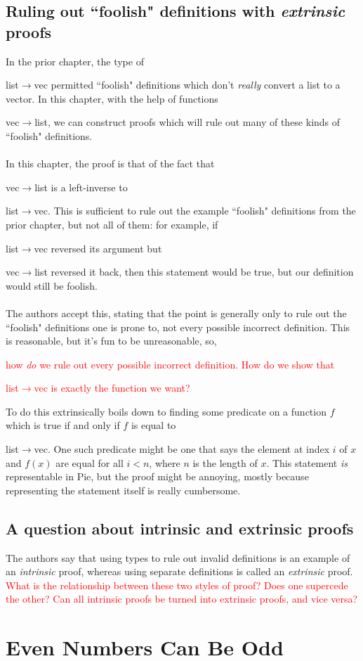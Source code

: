 \documentclass{article}
\newcommand*{\SavedLstInline}{}
\DeclareRobustCommand*{\lstinline}{%
  \ifmmode
    \let\SavedBGroup\bgroup
    \def\bgroup{%
      \let\bgroup\SavedBGroup
      \hbox\bgroup
    }%
  \fi
  \SavedLstInline
}
\begin{document}
\subsection{Ruling out ``foolish" definitions with \textit{extrinsic} proofs}
In the prior chapter, the type of \lstinline{list\(\to\)vec} permitted ``foolish" definitions which don't \textit{really} convert a list to a vector. In this chapter, with the help of functions \lstinline{vec\(\to\)list}, we can construct proofs which will rule out many of these kinds of ``foolish" definitions.
\\ \\
In this chapter, the proof is that of the fact that \lstinline{vec\(\to\)list} is a left-inverse to \lstinline{list\(\to\)vec}. This is sufficient to rule out the example ``foolish" definitions from the prior chapter, but not all of them: for example, if \lstinline{list\(\to\)vec} reversed its argument but \lstinline{vec\(\to\)list} reversed it back, then this statement would be true, but our definition would still be foolish.
\\ \\
The authors accept this, stating that the point is generally only to rule out the ``foolish" definitions one is prone to, not every possible incorrect definition. This is reasonable, but it's fun to be unreasonable, so, \textcolor{red}{how \textit{do} we rule out every possible incorrect definition. How do we show that \lstinline{list\(\to\)vec} is exactly the function we want?} To do this extrinsically boils down to finding some predicate on a function \(f\) which is true if and only if \(f\) is equal to \lstinline{list\(\to\)vec}. One such predicate might be one that says the element at index \(i\) of \(x\) and \(f(x)\) are equal for all \(i < n\), where \(n\) is the length of \(x\). This statement \textit{is} representable in Pie, but the proof might be annoying, mostly because representing the statement itself is really cumbersome.
\subsection{A question about intrinsic and extrinsic proofs}
The authors say that using types to rule out invalid definitions is an example of an \textit{intrinsic} proof, whereas using separate definitions is called an \textit{extrinsic} proof. \textcolor{red}{What is the relationship between these two styles of proof? Does one supercede the other? Can all intrinsic proofs be turned into extrinsic proofs, and vice versa?}
\section{Even Numbers Can Be Odd}
\end{document}
